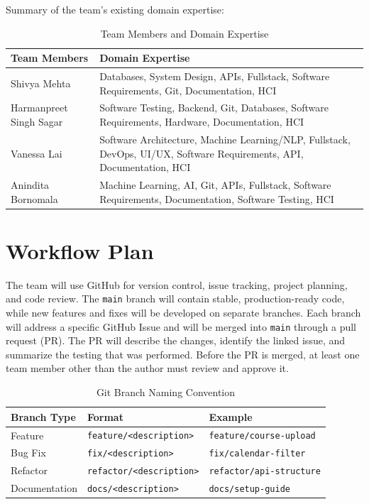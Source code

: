 \documentclass{article}
\begin{document}
Summary of the team's existing domain expertise:
\begin{table}[H]
\centering
\begin{tabularx}{\textwidth}{|p{}|X|}
\hline
\textbf{Team Members} & \textbf{Domain Expertise} \\
\hline
Shivya Mehta & Databases, System Design, APIs, Fullstack, Software Requirements, Git, Documentation, HCI \\
\hline
Harmanpreet Singh Sagar & Software Testing, Backend, Git, Databases, Software Requirements, Hardware, Documentation, HCI \\
\hline
Vanessa Lai & Software Architecture, Machine Learning/NLP, Fullstack, DevOps, UI/UX, Software Requirements, API, Documentation, HCI \\
\hline
Anindita Bornomala & Machine Learning, AI, Git, APIs, Fullstack, Software Requirements, Documentation, Software Testing, HCI \\
\hline
\end{tabularx}
\caption{Team Members and Domain Expertise}\label{tab:team_expertise}
\end{table}



\section{Workflow Plan} \label{sec_WorkflowPlan}

The team will use GitHub for version control, issue tracking, project planning,
and code review. The \texttt{main} branch will contain stable,
production-ready code, while new features and fixes will be developed on
separate branches. Each branch will address a specific GitHub Issue
and will be merged into \texttt{main} through a pull request (PR). The PR will
describe the changes, identify the linked issue, and summarize the testing that
was performed. Before the PR is merged, at least one team member other than the
author must review and approve it.

\begin{table}[H]
\centering
\begin{tabular}{|l|l|l|}
\hline
\textbf{Branch Type} & \textbf{Format} & \textbf{Example} \\ \hline
Feature & \texttt{feature/<description>} & \texttt{feature/course-upload} \\ \hline
Bug Fix & \texttt{fix/<description>} & \texttt{fix/calendar-filter} \\ \hline
Refactor & \texttt{refactor/<description>} & \texttt{refactor/api-structure} \\ \hline
Documentation & \texttt{docs/<description>} & \texttt{docs/setup-guide} \\ \hline
\end{tabular}
\caption{Git Branch Naming Convention}
\label{tab}
\end{table}
\end{document}
